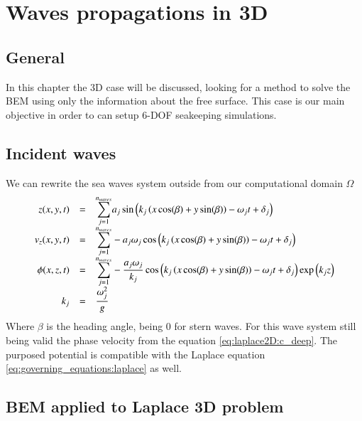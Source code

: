 \chapter{Waves propagations in 3D}
\label{s:laplace3D}
%
\section{General}
%
In this chapter the 3D case will be discussed, looking for
a method to solve the BEM using only the information about
the free surface.
%
This case is our main objective in order to can setup 6-DOF
seakeeping simulations.
%
\section{Incident waves}
%
We can rewrite the sea waves system outside from our
computational domain $\Omega$
%
\begin{eqnarray}
	\label{eq:laplace3D:incident_waves}
	\begin{array}{rcl}
	z(x,y,t) & = & \dsty{\sum_{j=1}^{n_{waves}}} a_j \sin\left(k_j \left(x \cos(\beta) + y \sin(\beta)\right) - \omega_j t + \delta_j \right)
	\\
	v_z(x,y,t) & = & \dsty{\sum_{j=1}^{n_{waves}}} - a_j \omega_j \cos\left(k_j \left(x \cos(\beta) + y \sin(\beta)\right) - \omega_j t + \delta_j \right)
	\\
	\phi(x,z,t) & = & \dsty{\sum_{j=1}^{n_{waves}}} - \frac{a_j \omega_j}{k_j}
	                \cos\left(k_j \left(x \cos(\beta) + y \sin(\beta)\right) - \omega_j t + \delta_j \right)
	                \exp\left(k_j z\right)
	\\
	k_j & = & \dsty{\frac{\omega_j^2}{g}}
	\end{array}
\end{eqnarray}
%
Where $\beta$ is the heading angle, being 0 for stern waves. For
this wave system still being valid the phase velocity from the
equation \ref{eq:laplace2D:c_deep}. The purposed potential is
compatible with the Laplace equation
\ref{eq:governing_equations:laplace} as well.
%
\section{BEM applied to Laplace 3D problem}
\label{ss:laplace3D:bem}
%
